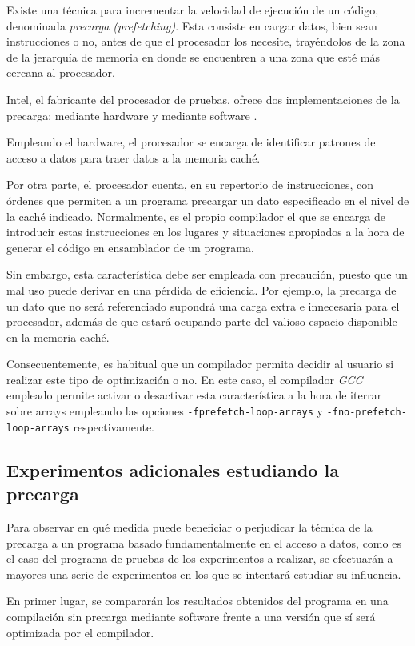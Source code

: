 \documentclass[conference]{IEEEtran}
\begin{document}
Existe una técnica para incrementar la velocidad de ejecución de un código, denominada \textit{precarga (prefetching)}. Esta consiste en cargar datos, bien sean instrucciones o no, antes de que el procesador los necesite, trayéndolos de la zona de la jerarquía de memoria en donde se encuentren a una zona que esté más cercana al procesador.

Intel, el fabricante del procesador de pruebas, ofrece dos implementaciones de la precarga: mediante hardware y mediante software \cite{precargas}.

Empleando el hardware, el procesador se encarga de identificar patrones de acceso a datos para traer datos a la memoria caché.

Por otra parte, el procesador cuenta, en su repertorio de instrucciones, con órdenes que permiten a un programa precargar un dato especificado en el nivel de la caché indicado. Normalmente, es el propio compilador el que se encarga de introducir estas instrucciones en los lugares y situaciones apropiados a la hora de generar el código en ensamblador de un programa.

Sin embargo, esta característica debe ser empleada con precaución, puesto que un mal uso puede derivar en una pérdida de eficiencia. Por ejemplo, la precarga de un dato que no será referenciado supondrá una carga extra e innecesaria para el procesador, además de que estará ocupando parte del valioso espacio disponible en la memoria caché.

Consecuentemente, es habitual que un compilador permita decidir al usuario si realizar este tipo de optimización o no. En este caso, el compilador \textit{GCC} empleado permite activar o desactivar esta característica a la hora de iterrar sobre arrays empleando las opciones \texttt{-fprefetch-loop-arrays} y \texttt{-fno-prefetch-loop-arrays} respectivamente.

\subsection{Experimentos adicionales estudiando la precarga}

Para observar en qué medida puede beneficiar o perjudicar la técnica de la precarga a un programa basado fundamentalmente en el acceso a datos, como es el caso del programa de pruebas de los experimentos a realizar, se efectuarán a mayores una serie de experimentos en los que se intentará estudiar su influencia.

En primer lugar, se compararán los resultados obtenidos del programa en una compilación sin precarga mediante software frente a una versión que sí será optimizada por el compilador.
\end{document}
